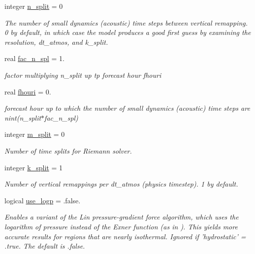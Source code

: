 \begin{DoxyCompactItemize}
integer \hyperlink{structfv__arrays__mod_1_1fv__flags__type_afe4a5c83b6de70b849935c4947ca5205}{n\-\_\-split} = 0
\begin{DoxyCompactList}\small\item\em The number of small dynamics (acoustic) time steps between vertical remapping. 0 by default, in which case the model produces a good first guess by examining the resolution, dt\-\_\-atmos, and k\-\_\-split. \end{DoxyCompactList}\item 
real \hyperlink{structfv__arrays__mod_1_1fv__flags__type_a1fc8fecf8287bd8afbc67f8b07bace74}{fac\-\_\-n\-\_\-spl} = 1.
\begin{DoxyCompactList}\small\item\em factor multiplying n\-\_\-split up tp forecast hour fhouri \end{DoxyCompactList}\item 
real \hyperlink{structfv__arrays__mod_1_1fv__flags__type_ac715c1c5c6fef1874fdc63eead44474a}{fhouri} = 0.
\begin{DoxyCompactList}\small\item\em forecast hour up to which the number of small dynamics (acoustic) time steps are nint(n\-\_\-split$\ast$fac\-\_\-n\-\_\-spl) \end{DoxyCompactList}\item 
integer \hyperlink{structfv__arrays__mod_1_1fv__flags__type_a2cd3cf16f02e720572e7c87e3a6956d6}{m\-\_\-split} = 0
\begin{DoxyCompactList}\small\item\em Number of time splits for Riemann solver. \end{DoxyCompactList}\item 
integer \hyperlink{structfv__arrays__mod_1_1fv__flags__type_aad360e02d5ab08a1d399be638923e040}{k\-\_\-split} = 1
\begin{DoxyCompactList}\small\item\em Number of vertical remappings per dt\-\_\-atmos (physics timestep). 1 by default. \end{DoxyCompactList}\item 
logical \hyperlink{structfv__arrays__mod_1_1fv__flags__type_a6fa8ab036af819f76ae61c9ae8e81adc}{use\-\_\-logp} = .false.
\begin{DoxyCompactList}\small\item\em Enables a variant of the Lin pressure-\/gradient force algorithm, which uses the logarithm of pressure instead of the Exner function (as in \cite{lin1997explicit}). This yields more accurate results for regions that are nearly isothermal. Ignored if 'hydrostatic' = .true. The default is .false. \end{DoxyCompactList}\item 

\end{DoxyCompactItemize}
